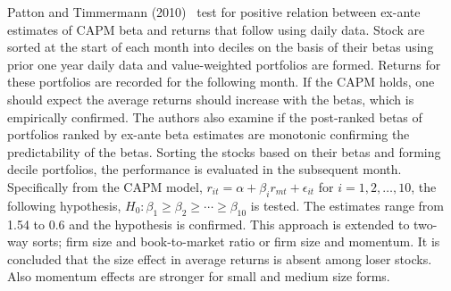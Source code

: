 Patton and Timmermann (2010)~\cite{pattim} test for positive relation between ex-ante estimates of CAPM beta and returns that follow using daily data. Stock are sorted at the start of each month into deciles on the basis of their betas using prior one year daily data and value-weighted portfolios are formed. Returns for these portfolios are recorded for the following month. If the CAPM holds, one should expect the average returns should increase with the betas, which is empirically confirmed. The authors also examine if the post-ranked betas of portfolios ranked by ex-ante beta estimates are monotonic confirming the predictability of the betas. Sorting the stocks based on their betas and forming decile portfolios, the performance is evaluated in the subsequent month. Specifically from the CAPM model, $r_{it}= \alpha + \beta_i r_{mt} + \epsilon_{it}$ for $i=1,2,\ldots,10$, the following hypothesis, $H_0: \beta_1 \geq \beta_2 \geq \cdots \geq \beta_{10}$ is tested. The estimates range from 1.54 to 0.6 and the hypothesis is confirmed. This approach is extended to two-way sorts; firm size and book-to-market ratio or firm size and momentum. It is concluded that the size effect in average returns is absent among loser stocks. Also momentum effects are stronger for small and medium size forms. \\


